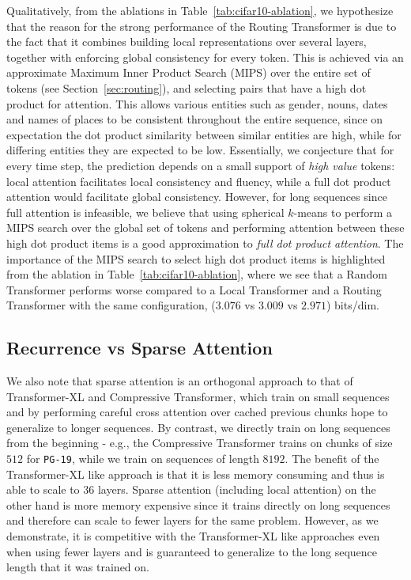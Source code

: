 Qualitatively, from the ablations in Table~\ref{tab:cifar10-ablation},
we hypothesize that the reason for the strong performance of the Routing Transformer is due to the fact that it combines building local representations over several layers, together with enforcing global consistency for every token. This is achieved via an approximate Maximum Inner Product Search (MIPS) over the entire set of tokens (see Section~\ref{sec:routing}),
and selecting pairs that have a high dot product for attention. This allows various entities such as gender, nouns, dates and names of places to be consistent throughout the entire sequence, since on expectation the dot product similarity between similar entities are high, while for differing entities they are expected to be low. Essentially, we conjecture that for every time step, the prediction depends on a small support of \emph{high value} tokens: local attention facilitates local consistency and fluency, while a full dot product attention would facilitate global consistency. However, for long sequences since full attention is infeasible, we believe that using spherical \(k\)-means to perform a MIPS search over the global set of tokens and performing attention between these high dot product items is a good approximation to \emph{full dot product attention}. The importance of the MIPS search to select high dot product items is highlighted from the ablation in 
Table~\ref{tab:cifar10-ablation}, where we see that a Random Transformer performs worse compared to a Local Transformer and a Routing Transformer with the same configuration, (\(3.076\) vs \(3.009\) vs \(2.971\)) bits/dim.

\subsection{Recurrence vs Sparse Attention} We also note that sparse attention is an orthogonal approach to that of Transformer-XL and Compressive Transformer, which train on small sequences and by performing careful cross attention over cached previous chunks hope to generalize to longer sequences. By contrast, we directly train on long sequences from the beginning - e.g., the Compressive Transformer trains on chunks of size \(512\) for \texttt{PG-19}, while we train on sequences of length \(8192\). 
The benefit of the Transformer-XL like approach is that it is less memory consuming and thus is able to scale to \(36\) layers. Sparse attention (including local attention) on the other hand is more memory expensive since it trains directly on long sequences and therefore can scale to fewer layers for the same problem. However, as we demonstrate, it is competitive with the Transformer-XL like approaches even when using fewer layers and is guaranteed to generalize to the long sequence length that it was trained on.

